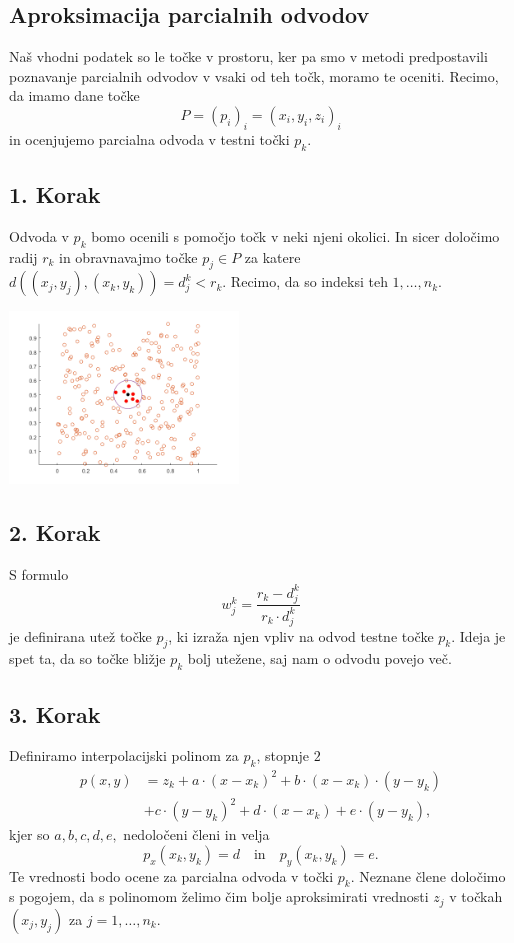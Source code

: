 \documentclass[ignorenonframetext]{beamer}
\let\frametitle\subsection %
\begin{document}
\begin{frame}
\frametitle{Aproksimacija parcialnih odvodov}

Naš vhodni podatek so le točke v prostoru, ker pa smo v metodi predpostavili 
poznavanje parcialnih odvodov v vsaki od teh točk, moramo te oceniti.
\vspace{10px}
Recimo, da imamo dane točke
$$P = (p_i)_i = (x_i,y_i,z_i)_i$$
in ocenjujemo parcialna odvoda v testni točki $p_k$.
\end{frame}

\begin{frame}
\frametitle{1. Korak}
Odvoda v $p_k$ bomo ocenili s pomočjo točk v neki njeni okolici. 
In sicer določimo radij $r_k$ in obravnavajmo točke $p_j \in P$ za katere $d((x_j,y_j), (x_k,y_k)) = d^k_j < r_k$.
Recimo, da so indeksi teh $1,\dots, n_k$.
\begin{center}
	\includegraphics[width=230px]{slike/pointRadius.png}
\end{center}
\end{frame}

\begin{frame}
\frametitle{2. Korak}
S formulo 
$$w^k_j = \frac{r_k - d^k_j}{r_k \cdot d^k_j}$$
je definirana utež točke $p_j$, ki izraža njen vpliv na odvod testne točke $p_k$.
Ideja je spet ta, da so točke bližje $p_k$ bolj utežene, saj nam o odvodu povejo več.
\end{frame}

\begin{frame}
\frametitle{3. Korak}
Definiramo interpolacijski polinom za $p_k$, stopnje $2$
\begin{equation*}
\begin{aligned}
p(x,y) &= z_k + a \cdot (x - x_k)^2 + b \cdot (x - x_k) \cdot (y - y_k) \\
&+ c \cdot (y - y_k)^2 + d \cdot (x-x_k) + e\cdot(y-y_k),
\end{aligned}
\end{equation*}
kjer so $a,b,c,d,e,$ nedoločeni členi in velja 
$$p_x(x_k,y_k) = d \quad \text{in} \quad p_y(x_k,y_k) = e.$$
Te vrednosti bodo ocene za parcialna odvoda v točki $p_k$.
Neznane člene določimo s pogojem, da s polinomom
želimo čim bolje aproksimirati vrednosti $z_j$ v točkah $(x_j,y_j)$ za $j=1,\dots,n_k$.
\end{frame}
\end{document}

